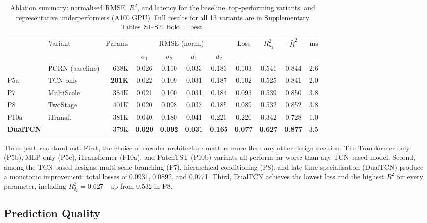\documentclass[journal]{IEEEtran}
\begin{document}
\begin{table}[t]
  \centering
  \caption{Ablation summary: normalised RMSE, $R^2$, and latency for
  the baseline, top-performing variants, and representative
  underperformers (A100 GPU). Full results for all 13 variants are in
  Supplementary Tables~S1--S2.  Bold = best.}
  \label{tab:results}
  \small
  \setlength{\tabcolsep}{3.5pt}
  \begin{tabular}{llrcccccccr}
    \toprule
    & Variant & Params & \multicolumn{4}{c}{RMSE (norm.)} & Loss
      & $R^2_{d_2}$ & $\bar{R}^2$ & ms \\
    \cmidrule(lr){4-7}
    & & & $\sigma_1$ & $\sigma_2$ & $d_1$ & $d_2$ & & & & \\
    \midrule
    & PCRN (baseline) & 638K & 0.026 & 0.110 & 0.033 & 0.183
      & 0.103 & 0.541 & 0.844 & 2.6 \\
    P5a & TCN-only    & \textbf{201K} & 0.022 & 0.109 & 0.031
      & 0.187 & 0.102 & 0.525 & 0.841 & 2.0 \\
    P7  & MultiScale  & 384K & 0.021 & 0.100 & 0.031 & 0.184
      & 0.093 & 0.539 & 0.850 & 3.8 \\
    P8  & TwoStage    & 401K & 0.020 & 0.098 & 0.033 & 0.185
      & 0.089 & 0.532 & 0.852 & 3.8 \\
    P10a & iTransf.   & 381K & 0.040 & 0.180 & 0.041 & 0.220
      & 0.220 & 0.342 & 0.728 & 1.0 \\
    \textbf{DualTCN}
      &              & 379K & \textbf{0.020} & \textbf{0.092}
      & \textbf{0.031} & \textbf{0.165}
      & \textbf{0.077} & \textbf{0.627} & \textbf{0.877} & 3.5 \\
    \bottomrule
  \end{tabular}
\end{table}

Three patterns stand out. First, the choice of encoder architecture
matters more than any other design decision. The Transformer-only
(P5b), MLP-only (P5c), iTransformer (P10a), and PatchTST (P10b)
variants all perform far worse than any TCN-based model. Second,
among the TCN-based designs, multi-scale branching (P7), hierarchical
conditioning (P8), and late-time specialisation (DualTCN) produce a
monotonic improvement: total losses of 0.0931, 0.0892, and 0.0771.
Third, DualTCN achieves the lowest loss and the highest $R^2$ for
every parameter, including $R^2_{d_2} = 0.627$---up from 0.532 in
P8.

\subsection{Prediction Quality}
\label{sec:pred_quality}
\end{document}
